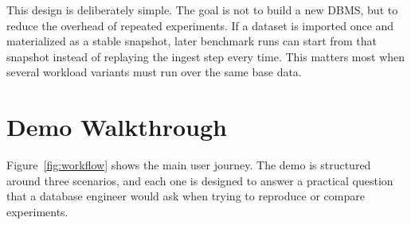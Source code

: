 \documentclass[runningheads]{llncs}
\begin{document}
This design is deliberately simple. The goal is not to build a new DBMS, but to reduce the overhead of repeated experiments. If a dataset is imported once and materialized as a stable snapshot, later benchmark runs can start from that snapshot instead of replaying the ingest step every time. This matters most when several workload variants must run over the same base data.

\section{Demo Walkthrough}
Figure~\ref{fig:workflow} shows the main user journey. The demo is structured around three scenarios, and each one is designed to answer a practical question that a database engineer would ask when trying to reproduce or compare experiments.
\end{document}
